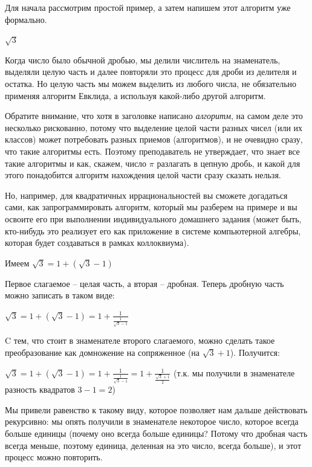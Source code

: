 \documentclass[russian]{lecture-notes}
\begin{document}
	Для начала рассмотрим простой пример, а затем напишем этот алгоритм уже формально.
	
	\begin{example*}
		$\sqrt{3}$
	
		Когда число было обычной дробью, мы делили числитель на знаменатель, выделяли целую часть и далее повторяли это процесс для дроби из делителя и остатка. Но целую часть мы можем выделить из любого числа, не обязательно применяя алгоритм Евклида, а используя какой-либо другой алгоритм. 
		
		\begin{remark}
			Обратите внимание, что хотя в заголовке написано \textit{алгоритм}, на самом деле это несколько рискованно, потому что выделение целой части разных чисел (или их классов) может потребовать разных приемов (алгоритмов), и не очевидно сразу, что такие алгоритмы есть. Поэтому преподаватель не утверждает, что знает все такие алгоритмы и как, скажем, число $\pi$ разлагать в цепную дробь, и  какой для этого понадобится алгоритм нахождения целой части сразу сказать нельзя.
			
			Но, например, для квадратичных иррациональностей вы сможете догадаться сами, как запрограммировать алгоритм, который мы разберем на примере и вы освоите его при выполнении индивидуального домашнего задания (может быть, кто-нибудь это реализует его как приложение в системе компьютерной алгебры, которая будет создаваться в рамках коллоквиума).
		\end{remark}
	
		Имеем $\sqrt{3} = 1 + (\sqrt{3} - 1)$
		
		Первое слагаемое -- целая часть, а вторая -- дробная. Теперь дробную часть можно записать в таком виде:
		
		$\sqrt{3} = 1 + (\sqrt{3} - 1) = 1 + \frac{1}{\frac{1}{\sqrt{3}-1}}$
		
		C тем, что стоит в знаменателе второго слагаемого, можно сделать такое преобразование как домножение на сопряженное (на $\sqrt{3} + 1$). Получится:
		
		$\sqrt{3} = 1 + (\sqrt{3} - 1) = 1 + \frac{1}{\frac{1}{\sqrt{3}-1}} = 1 + \frac{1}{\frac{\sqrt{3}+1}{2}}$ (т.к. мы получили в знаменателе разность квадратов $3 - 1 = 2$)
		
		Мы привели равенство к такому виду, которое позволяет нам дальше действовать рекурсивно: мы опять получили в знаменателе некоторое число, которое всегда больше единицы (почему оно всегда больше единицы? Потому что дробная часть всегда меньше, поэтому единица, деленная на это число, всегда больше), и этот процесс можно повторить.
		

\end{example*}
\end{document}
